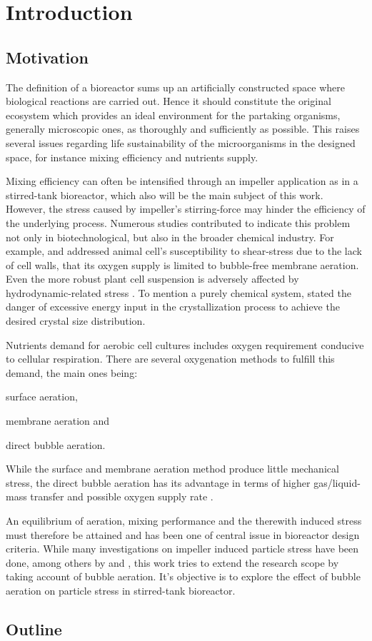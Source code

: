 \chapter{Introduction} \label{ch:introduction}

\section{Motivation}
The definition of a bioreactor sums up an artificially constructed space where biological reactions are carried out. Hence it should constitute the original ecosystem which provides an ideal environment for the partaking organisms, generally microscopic ones, as thoroughly and sufficiently as possible. This raises several issues regarding life sustainability of the microorganisms in the designed space, for instance mixing efficiency and nutrients supply.

Mixing efficiency can often be intensified through an impeller application as in a stirred-tank bioreactor, which also will be the main subject of this work. However, the stress caused by impeller's stirring-force may hinder the efficiency of the underlying process. Numerous studies contributed to indicate this problem not only in biotechnological, but also in the broader chemical industry. For example, \citet{Frahm2007} and \citet{Henzler1993} addressed animal cell's susceptibility to shear-stress due to the lack of cell walls, that its oxygen supply is limited to bubble-free membrane aeration. Even the more robust plant cell suspension is adversely affected by hydrodynamic-related stress \citep{Eibl2009}. To mention a purely chemical system, \citet{Wollny2010Diss} stated the danger of excessive energy input in the crystallization process to achieve the desired crystal size distribution.

Nutrients demand for aerobic cell cultures includes oxygen requirement conducive to cellular respiration. There are several oxygenation methods to fulfill this demand, the main ones being: 
\begin{inlineenum}
    \item surface aeration,
    \item membrane aeration and
    \item direct bubble aeration.
\end{inlineenum}
While the surface and membrane aeration method produce little mechanical stress, the direct bubble aeration has its advantage in terms of higher gas/liquid-mass transfer and possible oxygen supply rate \citep{Henzler1993}.

An equilibrium of aeration, mixing performance and the therewith induced stress must therefore be attained and has been one of central issue in bioreactor design criteria. While many investigations on impeller induced particle stress have been done, among others by \citet{Wollny2010Diss} and \citet{Malik2018Master}, this work tries to extend the research scope by taking account of bubble aeration. It's objective is to explore the effect of bubble aeration on particle stress in stirred-tank bioreactor.
 

\section{Outline}